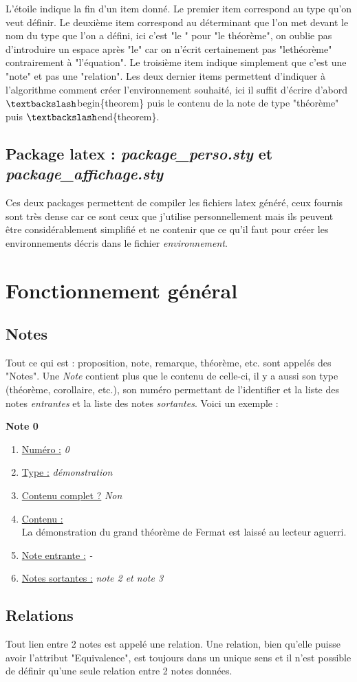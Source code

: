 \documentclass[12pt,a4paper]{article}
\begin{document}
	 L'étoile indique la fin d'un item donné. Le premier item correspond au type qu'on veut définir. Le deuxième item correspond au déterminant que l'on met devant le nom du type que l'on a défini, ici c'est "le " pour "le théorème", on oublie pas d'introduire un espace après "le" car on n'écrit certainement pas "lethéorème" contrairement à "l'équation". Le troisième item indique simplement que c'est une "note" et pas une "relation". Les deux dernier items permettent d'indiquer à l'algorithme comment créer l'environnement souhaité, ici il suffit d'écrire d'abord  $\textbackslash$begin\{theorem\} puis le contenu de la note de type "théorème" puis $\textbackslash$end\{theorem\}.
	
	\subsection{Package latex : \textit{package\_perso.sty} et \textit{package\_affichage.sty}}
	
	Ces deux packages permettent de compiler les fichiers latex généré, ceux fournis sont très dense car ce sont ceux que j'utilise personnellement mais ils peuvent être considérablement simplifié et ne contenir que ce qu'il faut pour créer les environnements décris dans le fichier \textit{environnement}.
	
	
	\section{Fonctionnement général}
	
	\subsection{Notes}
	
	Tout ce qui est : proposition, note, remarque, théorème, etc. sont appelés des "Notes". Une \textit{Note} contient plus que le contenu de celle-ci, il y a aussi son type (théorème, corollaire, etc.), son numéro permettant de l'identifier et la liste des notes \textit{entrantes} et la liste des notes \textit{sortantes}. Voici un exemple :
	\begin{center}
		\textbf{Note 0}
	\end{center}
	\begin{enumerate}
		\item \underline{Numéro :} \textit{0}
		\item \underline{Type :} \textit{démonstration}
		\item \underline{Contenu complet ?} \textit{Non}
		\item \underline{Contenu :}\\
		\hspace*{.5cm} La démonstration du grand théorème de Fermat est laissé au lecteur aguerri.
		\item \underline{Note entrante :}\textit{ -}
		\item \underline{Notes sortantes :}\textit{ note 2 et note 3}
	\end{enumerate}
	
	\subsection{Relations}
	
	Tout lien entre 2 notes est appelé une relation. Une relation, bien qu'elle puisse avoir l’attribut "Equivalence", est toujours dans un unique sens et il n'est possible de définir qu'une seule relation entre 2 notes données. 
	
\end{document}
